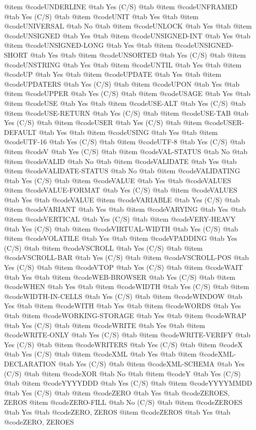 @item @code{UNDERLINE} @tab Yes	(C/S) @tab
@item @code{UNFRAMED} @tab Yes	(C/S) @tab
@item @code{UNIT} @tab Yes @tab
@item @code{UNIVERSAL} @tab No @tab
@item @code{UNLOCK} @tab Yes @tab
@item @code{UNSIGNED} @tab Yes @tab
@item @code{UNSIGNED-INT} @tab Yes @tab
@item @code{UNSIGNED-LONG} @tab Yes @tab
@item @code{UNSIGNED-SHORT} @tab Yes @tab
@item @code{UNSORTED} @tab Yes	(C/S) @tab
@item @code{UNSTRING} @tab Yes @tab
@item @code{UNTIL} @tab Yes @tab
@item @code{UP} @tab Yes @tab
@item @code{UPDATE} @tab Yes @tab
@item @code{UPDATERS} @tab Yes	(C/S) @tab
@item @code{UPON} @tab Yes @tab
@item @code{UPPER} @tab Yes	(C/S) @tab
@item @code{USAGE} @tab Yes @tab
@item @code{USE} @tab Yes @tab
@item @code{USE-ALT} @tab Yes	(C/S) @tab
@item @code{USE-RETURN} @tab Yes	(C/S) @tab
@item @code{USE-TAB} @tab Yes	(C/S) @tab
@item @code{USER} @tab Yes	(C/S) @tab
@item @code{USER-DEFAULT} @tab Yes @tab
@item @code{USING} @tab Yes @tab
@item @code{UTF-16} @tab Yes	(C/S) @tab
@item @code{UTF-8} @tab Yes	(C/S) @tab
@item @code{V} @tab Yes	(C/S) @tab
@item @code{VAL-STATUS} @tab No @tab
@item @code{VALID} @tab No @tab
@item @code{VALIDATE} @tab Yes @tab
@item @code{VALIDATE-STATUS} @tab No @tab
@item @code{VALIDATING} @tab Yes	(C/S) @tab
@item @code{VALUE} @tab Yes @tab @code{VALUES}
@item @code{VALUE-FORMAT} @tab Yes	(C/S) @tab
@item @code{VALUES} @tab Yes @tab @code{VALUE}
@item @code{VARIABLE} @tab Yes	(C/S) @tab
@item @code{VARIANT} @tab Yes @tab
@item @code{VARYING} @tab Yes @tab
@item @code{VERTICAL} @tab Yes	(C/S) @tab
@item @code{VERY-HEAVY} @tab Yes	(C/S) @tab
@item @code{VIRTUAL-WIDTH} @tab Yes	(C/S) @tab
@item @code{VOLATILE} @tab Yes @tab
@item @code{VPADDING} @tab Yes	(C/S) @tab
@item @code{VSCROLL} @tab Yes	(C/S) @tab
@item @code{VSCROLL-BAR} @tab Yes	(C/S) @tab
@item @code{VSCROLL-POS} @tab Yes	(C/S) @tab
@item @code{VTOP} @tab Yes	(C/S) @tab
@item @code{WAIT} @tab Yes @tab
@item @code{WEB-BROWSER} @tab Yes	(C/S) @tab
@item @code{WHEN} @tab Yes @tab
@item @code{WIDTH} @tab Yes	(C/S) @tab
@item @code{WIDTH-IN-CELLS} @tab Yes	(C/S) @tab
@item @code{WINDOW} @tab Yes @tab
@item @code{WITH} @tab Yes @tab
@item @code{WORDS} @tab Yes @tab
@item @code{WORKING-STORAGE} @tab Yes @tab
@item @code{WRAP} @tab Yes	(C/S) @tab
@item @code{WRITE} @tab Yes @tab
@item @code{WRITE-ONLY} @tab Yes (C/S) @tab
@item @code{WRITE-VERIFY} @tab Yes (C/S) @tab
@item @code{WRITERS} @tab Yes	(C/S) @tab
@item @code{X} @tab Yes	(C/S) @tab
@item @code{XML} @tab Yes @tab
@item @code{XML-DECLARATION} @tab Yes	(C/S) @tab
@item @code{XML-SCHEMA} @tab Yes	(C/S) @tab
@item @code{XOR} @tab No @tab
@item @code{Y} @tab Yes	(C/S) @tab
@item @code{YYYYDDD} @tab Yes	(C/S) @tab
@item @code{YYYYMMDD} @tab Yes	(C/S) @tab
@item @code{ZERO} @tab Yes @tab @code{ZEROES, ZEROS}
@item @code{ZERO-FILL} @tab No	(C/S) @tab
@item @code{ZEROES} @tab Yes @tab @code{ZERO, ZEROS}
@item @code{ZEROS} @tab Yes @tab @code{ZERO, ZEROES}


